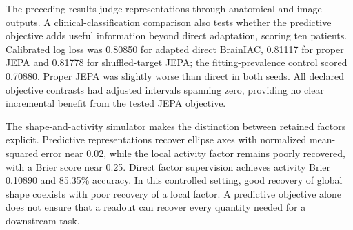 The preceding results judge representations through anatomical and image outputs. A clinical-classification comparison also tests whether the predictive objective adds useful information beyond direct adaptation, scoring ten patients. Calibrated log loss was 0.80850 for adapted direct BrainIAC, 0.81117 for proper JEPA and 0.81778 for shuffled-target JEPA; the fitting-prevalence control scored 0.70880. Proper JEPA was slightly worse than direct in both seeds. All declared objective contrasts had adjusted intervals spanning zero, providing no clear incremental benefit from the tested JEPA objective.

The shape-and-activity simulator makes the distinction between retained factors explicit. Predictive representations recover ellipse axes with normalized mean-squared error near 0.02, while the local activity factor remains poorly recovered, with a Brier score near 0.25. Direct factor supervision achieves activity Brier 0.10890 and 85.35\% accuracy. In this controlled setting, good recovery of global shape coexists with poor recovery of a local factor. A predictive objective alone does not ensure that a readout can recover every quantity needed for a downstream task.

\endgroup
